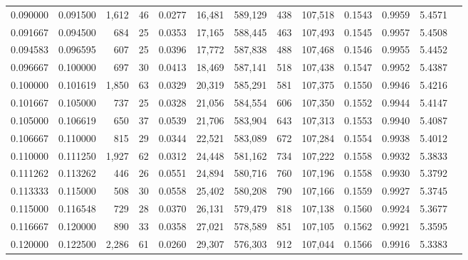 \begin{tabular}{rrrrrrrrrrrrr}
0.090000 & 0.091500 & 1,612 &  46 &                                     0.0277 &  16,481 & 589,129 &     438 & 107,518 & 0.1543 & 0.9959 & 5.4571 \\
0.091667 & 0.094500 &   684 &  25 &                                     0.0353 &  17,165 & 588,445 &     463 & 107,493 & 0.1545 & 0.9957 & 5.4508 \\
0.094583 & 0.096595 &   607 &  25 &                                     0.0396 &  17,772 & 587,838 &     488 & 107,468 & 0.1546 & 0.9955 & 5.4452 \\
0.096667 & 0.100000 &   697 &  30 &                                     0.0413 &  18,469 & 587,141 &     518 & 107,438 & 0.1547 & 0.9952 & 5.4387 \\
0.100000 & 0.101619 & 1,850 &  63 &                                     0.0329 &  20,319 & 585,291 &     581 & 107,375 & 0.1550 & 0.9946 & 5.4216 \\
0.101667 & 0.105000 &   737 &  25 &                                     0.0328 &  21,056 & 584,554 &     606 & 107,350 & 0.1552 & 0.9944 & 5.4147 \\
0.105000 & 0.106619 &   650 &  37 &                                     0.0539 &  21,706 & 583,904 &     643 & 107,313 & 0.1553 & 0.9940 & 5.4087 \\
0.106667 & 0.110000 &   815 &  29 &                                     0.0344 &  22,521 & 583,089 &     672 & 107,284 & 0.1554 & 0.9938 & 5.4012 \\
0.110000 & 0.111250 & 1,927 &  62 &                                     0.0312 &  24,448 & 581,162 &     734 & 107,222 & 0.1558 & 0.9932 & 5.3833 \\
0.111262 & 0.113262 &   446 &  26 &                                     0.0551 &  24,894 & 580,716 &     760 & 107,196 & 0.1558 & 0.9930 & 5.3792 \\
0.113333 & 0.115000 &   508 &  30 &                                     0.0558 &  25,402 & 580,208 &     790 & 107,166 & 0.1559 & 0.9927 & 5.3745 \\
0.115000 & 0.116548 &   729 &  28 &                                     0.0370 &  26,131 & 579,479 &     818 & 107,138 & 0.1560 & 0.9924 & 5.3677 \\
0.116667 & 0.120000 &   890 &  33 &                                     0.0358 &  27,021 & 578,589 &     851 & 107,105 & 0.1562 & 0.9921 & 5.3595 \\
0.120000 & 0.122500 & 2,286 &  61 &                                     0.0260 &  29,307 & 576,303 &     912 & 107,044 & 0.1566 & 0.9916 & 5.3383 \\

\end{tabular}
